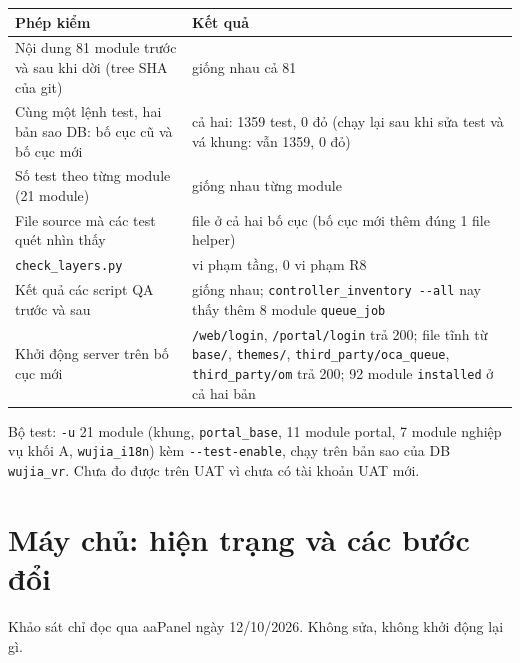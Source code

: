 \begin{center}
\small
\begin{tabularx}{\textwidth}{>{\raggedright\arraybackslash}p{5.2cm}>{\raggedright\arraybackslash}X}
\toprule
\textbf{Phép kiểm} & \textbf{Kết quả} \\
\midrule
Nội dung 81 module trước và sau khi dời (tree SHA của git) & giống nhau cả 81 \\
Cùng một lệnh test, hai bản sao DB: bố cục cũ và bố cục mới &
  cả hai: 1359 test, 0 đỏ (chạy lại sau khi sửa test và vá khung: vẫn 1359, 0 đỏ) \\
Số test theo từng module (21 module) & giống nhau từng module \\
File source mà các test quét nhìn thấy & 2092 file ở cả hai bố cục (bố cục mới thêm đúng 1 file helper) \\
\texttt{check\_layers.py} & 0 vi phạm tầng, 0 vi phạm R8 \\
Kết quả các script QA trước và sau & giống nhau; \texttt{controller\_inventory -{}-all} nay thấy thêm 8 module
  \texttt{queue\_job} \\
Khởi động server trên bố cục mới & \texttt{/web/login}, \texttt{/portal/login} trả 200; file tĩnh từ \texttt{base/}, \texttt{themes/}, \texttt{third\_party/oca\_queue}, \texttt{third\_party/om} trả 200; 92 module \texttt{installed} ở cả hai bản \\
\bottomrule
\end{tabularx}
\end{center}

Bộ test: \texttt{-u} 21 module (khung, \texttt{portal\_base}, 11 module portal, 7 module nghiệp vụ khối A,
\texttt{wujia\_i18n}) kèm \texttt{-{}-test-enable}, chạy trên bản sao của DB \texttt{wujia\_vr}. Chưa đo được trên
UAT vì chưa có tài khoản UAT mới.

\section{Máy chủ: hiện trạng và các bước đổi}
\label{sec:adr28-deploy}

Khảo sát chỉ đọc qua aaPanel ngày 12/10/2026. Không sửa, không khởi động lại gì.

